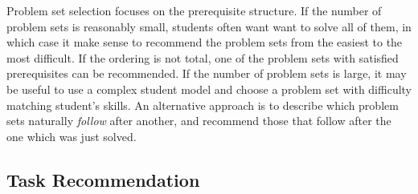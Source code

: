 
Problem set selection focuses on the prerequisite structure.
If the number of problem sets is reasonably small, students often want
want to solve all of them, in which case it make sense to recommend the problem
sets from the easiest to the most difficult.
If the ordering is not total, one of the problem sets with satisfied prerequisites
can be recommended.
If the number of problem sets is large, it may be useful to use a complex student model
and choose a problem set with difficulty matching student's skills.
An alternative approach is to describe which problem sets naturally \emph{follow} after another,
and recommend those that follow after the one which was just solved.


\subsection{Task Recommendation}  %
\label{sec:task-recommendation}


